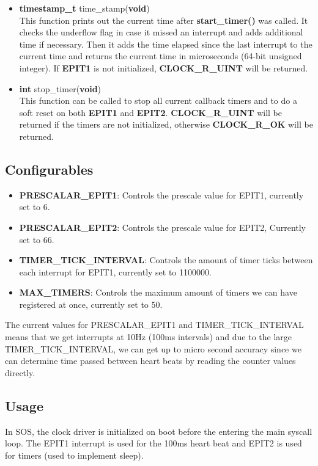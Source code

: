 \documentclass[12pt]{article}
\begin{document}
\begin{itemize}
\item \textbf{timestamp\_t} time\_stamp(\textbf{void})\\
This function prints out the current time after \textbf{start\_timer()} was called. It checks the underflow flag in case it missed an interrupt and adds additional time if necessary. Then it adds the time elapsed since the last interrupt to the current time and returns the current time in microseconds (64-bit unsigned integer). If \textbf{EPIT1} is not initialized, \textbf{CLOCK\_R\_UINT} will be returned.

\item \textbf{int} stop\_timer(\textbf{void})\\
This function can be called to stop all current callback timers and to do a soft reset on both \textbf{EPIT1} and \textbf{EPIT2}. \textbf{CLOCK\_R\_UINT} will be returned if the timers are not initialized, otherwise \textbf{CLOCK\_R\_OK} will be returned.
\end{itemize}

\subsection{Configurables}
\begin{itemize}
\item\textbf{PRESCALAR\_EPIT1}: Controls the prescale value for EPIT1, currently set to 6.
\item\textbf{PRESCALAR\_EPIT2}: Controls the prescale value for EPIT2, Currently set to 66.
\item\textbf{TIMER\_TICK\_INTERVAL}: Controls the amount of timer ticks between each interrupt for EPIT1, currently set to 1100000.
\item\textbf{MAX\_TIMERS}: Controls the maximum amount of timers we can have registered at once, currently set to 50.
\end{itemize}
The current values for PRESCALAR\_EPIT1 and TIMER\_TICK\_INTERVAL means that we get interrupts at 10Hz (100ms intervals) and due to the large TIMER\_TICK\_INTERVAL, we can get up to micro second accuracy since we can determine time passed between heart beats by reading the counter values directly.

\subsection{Usage}
In SOS, the clock driver is initialized on boot before the entering the main syscall loop. The EPIT1 interrupt is used for the 100ms heart beat and EPIT2 is used for timers (used to implement sleep). 
\end{document}
